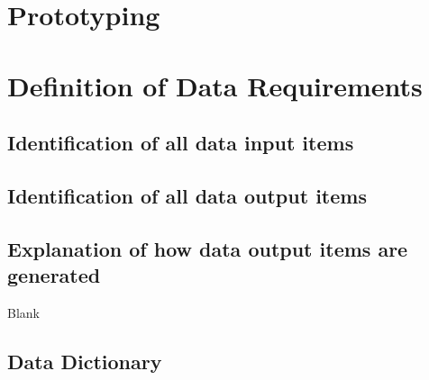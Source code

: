 \section{Prototyping}

\section{Definition of Data Requirements}

\subsection{Identification of all data input items}

\subsection{Identification of all data output items}

\subsection{Explanation of how data output items are generated}
Blank
\subsection{Data Dictionary}

